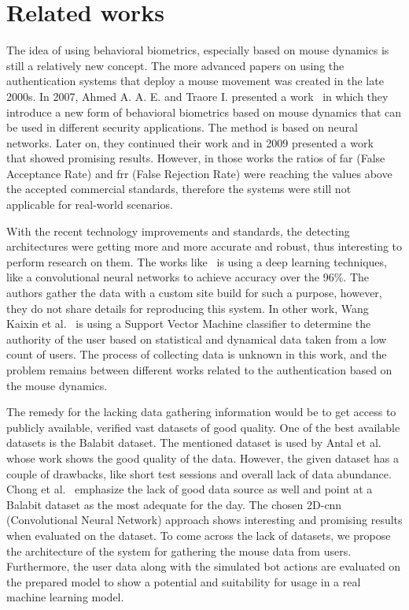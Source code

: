 \section{Related works}\label{sec:related-works}
The idea of using behavioral biometrics, especially based on mouse dynamics is still a relatively new concept.
The more advanced papers on using the authentication systems that deploy a mouse movement was created in the late 2000s.
In 2007, Ahmed A. A. E. and Traore I. presented a work~\cite{firstMouseBBPapers1} in which they introduce a new form of behavioral biometrics based on mouse dynamics that can be used in different security applications.
The method is based on neural networks.
Later on, they continued their work and in 2009 presented a work~\cite{wang2009behavioral} that showed promising results.
However, in those works the ratios of \gls{far} (False Acceptance Rate) and \gls{frr} (False Rejection Rate) were reaching the values above the accepted commercial standards, therefore the systems were still not applicable for real-world scenarios.

With the recent technology improvements and standards, the detecting architectures were getting more and more accurate and robust, thus interesting to perform research on them.
The works like~\cite{a-deep-learning-approach-to-web-bot-detection-using-mouse-behavioral-biometrics} is using a deep learning techniques, like a convolutional neural networks to achieve accuracy over the 96\%.
The authors gather the data with a custom site build for such a purpose, however, they do not share details for reproducing this system.
In other work, Wang Kaixin et al.~\cite{a-user-authentication-and-identification-model-based-on-mouse-dynamics} is using a Support Vector Machine classifier to determine the authority of the user based on statistical and dynamical data taken from a low count of users.
The process of collecting data is unknown in this work, and the problem remains between different works related to the authentication based on the mouse dynamics.

The remedy for the lacking data gathering information would be to get access to publicly available, verified vast datasets of good quality.
One of the best available datasets is the Balabit dataset.
The mentioned dataset is used by Antal et al.~\cite{antal2019intrusion} whose work shows the good quality of the data.
However, the given dataset has a couple of drawbacks, like short test sessions and overall lack of data abundance.
Chong et al.~\cite{Main} emphasize the lack of good data source as well and point at a Balabit dataset as the most adequate for the day.
The chosen 2D-\gls{cnn} (Convolutional Neural Network) approach shows interesting and promising results when evaluated on the dataset.
To come across the lack of datasets, we propose the architecture of the system for gathering the mouse data from users.
Furthermore, the user data along with the simulated bot actions are evaluated on the prepared model to show a potential and suitability for usage in a real machine learning model.
